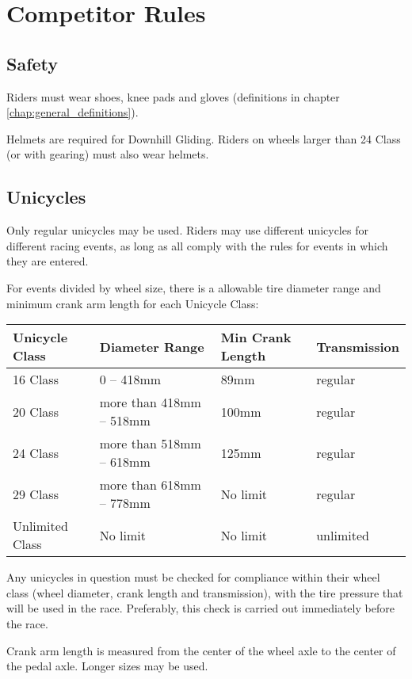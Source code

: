 \chapter{Competitor Rules}

\section{Safety}

Riders must wear shoes, knee pads and gloves (definitions in chapter \ref{chap:general_definitions}).

Helmets are required for Downhill Gliding.
Riders on wheels larger than 24 Class (or with gearing) must also wear helmets.

\section{Unicycles}

Only regular unicycles may be used.
Riders may use different unicycles for different racing events, as long as all comply with the rules for events in which they are entered.

For events divided by wheel size, there is a allowable tire diameter range and minimum crank arm length for each Unicycle Class:

\begin{longtable}{|p{2.8cm}|p{4.6cm}|p{3.6cm}|p{2.5cm}|}
\hline
\textbf{Unicycle Class} & \textbf{Diameter Range} & \textbf{Min Crank Length} & \textbf{Transmission}\\
\hline
16 Class & 0 -- 418mm & 89mm & regular \\
\hline
20 Class & more than 418mm -- 518mm & 100mm & regular \\
\hline
24 Class & more than 518mm -- 618mm & 125mm & regular \\
\hline
29 Class & more than 618mm -- 778mm & No limit & regular \\
\hline
Unlimited Class & No limit & No limit & unlimited \\
\hline
\end{longtable}

Any unicycles in question must be checked for compliance within their wheel class (wheel diameter, crank length and transmission), with the tire pressure that will be used in the race.
Preferably, this check is carried out immediately before the race.

Crank arm length is measured from the center of the wheel axle to the center of the pedal axle.
Longer sizes may be used.

